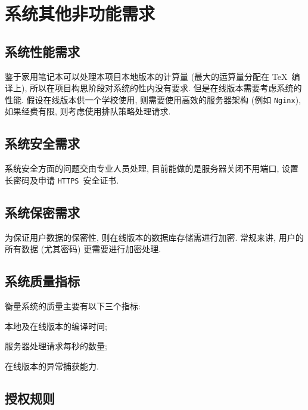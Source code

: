 \documentclass{ctexart}
\newcommand{\nginx}{\texttt{Nginx}}
\newcommand{\https}{\texttt{HTTPS}}
\begin{document}




\section{系统其他非功能需求}\label{S:other-nonfunctional-requirements}
\subsection{系统性能需求}
鉴于家用笔记本可以处理本项目本地版本的计算量 (最大的运算量分配在 \TeX\ 编译上), 所以在项目构思阶段对系统的性内没有要求. 但是在线版本需要考虑系统的性能. 假设在线版本供一个学校使用, 则需要使用高效的服务器架构 (例如 \nginx), 如果经费有限, 则考虑使用排队策略处理请求.


\subsection{系统安全需求}
系统安全方面的问题交由专业人员处理, 目前能做的是服务器关闭不用端口, 设置长密码及申请 \https\ 安全证书.


\subsection{系统保密需求}
为保证用户数据的保密性, 则在线版本的数据库存储需进行加密. 常规来讲, 用户的所有数据 (尤其密码) 更需要进行加密处理.


\subsection{系统质量指标}
衡量系统的质量主要有以下三个指标: \begin{enumerate*}[label=\textbf{\arabic*}]
    \item 本地及在线版本的编译时间;
    \item 服务器处理请求每秒的数量;
    \item 在线版本的异常捕获能力.
\end{enumerate*}


\subsection{授权规则}
\end{document}
